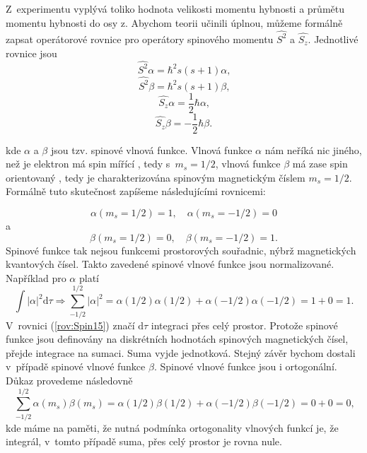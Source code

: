 Z~experimentu vyplývá toliko hodnota velikosti momentu hybnosti a průmětu momentu hybnosti do osy z. Abychom teorii učinili úplnou, můžeme formálně zapsat operátorové rovnice pro operátory spinového momentu $\hat{S^2}$ a $\hat{S_z}$. Jednotlivé rovnice jsou
\begin{equation}
\boxed{\hat{S^2}\alpha = \hbar^2 s(s+1)\alpha \mbox{,}}
\label{rov:Spin17}
\end{equation}
\begin{equation}
\boxed{\hat{S^2}\beta = \hbar^2 s(s+1)\beta \mbox{,}}
\label{rov:Spin18}
\end{equation}
\begin{equation}
\boxed{\hat{S_z}\alpha= \frac{1}{2}\hbar \alpha \mbox{,}}
\label{rov:Spin19}
\end{equation}
\begin{equation}
\boxed{\hat{S_z}\beta= -\frac{1}{2}\hbar \beta \mbox{.}}
\label{rov:Spin20}
\end{equation}

\noindent kde $\alpha$ a $\beta$ jsou tzv. spinové vlnová funkce. Vlnová funkce $\alpha$ nám neříká nic jiného, než je elektron má spin mířící , tedy s~$m_s=1/2$, vlnová funkce $\beta$ má zase spin orientovaný , tedy je charakterizována spinovým magnetickým číslem  $m_s=1/2$. Formálně tuto skutečnost zapíšeme následujícími rovnicemi: 

\begin{equation}
\alpha(m_s=1/2)=1, \quad \alpha(m_s=-1/2)=0
\label{rov:Spin13}
\end{equation}
a
\begin{equation}
\beta(m_s=1/2)=0,  \quad \beta(m_s=-1/2)=1 \mbox{.}
\label{rov:Spin14}
\end{equation}
Spinové funkce tak nejsou funkcemi prostorových souřadnic, nýbrž magnetických kvantových čísel. Takto zavedené spinové vlnové funkce jsou normalizované. Například pro $\alpha$ platí
\begin{equation}
\int |\alpha|^2 \mathrm{d}\tau \Rightarrow \sum_{-1/2}^{1/2}|\alpha|^2 = \alpha(1/2) \alpha(1/2) + \alpha(-1/2)\alpha(-1/2) = 1 + 0 = 1 \mbox{.}
\label{rov:Spin15}
\end{equation}
V~rovnici (\ref{rov:Spin15}) značí $\mathrm{d}\tau$ integraci přes celý prostor. Protože spinové funkce jsou definovány na diskrétních hodnotách spinových magnetických čísel, přejde integrace na sumaci. Suma vyjde jednotková. Stejný závěr bychom dostali v~případě spinové vlnové funkce $\beta$. Spinové vlnové funkce jsou i ortogonální. Důkaz provedeme následovně
\begin{equation}
\sum_{-1/2}^{1/2} \alpha(m_s) \beta(m_s) = \alpha(1/2) \beta(1/2) + \alpha(-1/2) \beta(-1/2) = 0 + 0 = 0 \mbox{,}
\label{rov:Spin16}
\end{equation}
kde máme na paměti, že nutná podmínka ortogonality vlnových funkcí je, že integrál, v~tomto případě suma, přes celý prostor je rovna nule.

